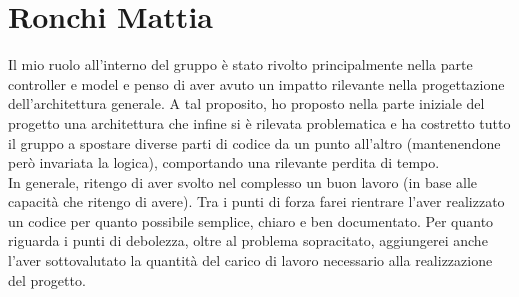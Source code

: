 \documentclass[a4paper,12pt]{report}
\begin{document}
\section{Ronchi Mattia}
Il mio ruolo all'interno del gruppo è stato rivolto principalmente nella parte controller e model e penso di aver avuto un impatto rilevante nella progettazione dell'architettura generale. A tal proposito, ho proposto nella parte iniziale del progetto una architettura che infine si è rilevata problematica e ha costretto tutto il gruppo a spostare diverse parti di codice da un punto all'altro (mantenendone però invariata la logica), comportando una rilevante perdita di tempo.\\
In generale, ritengo di aver svolto nel complesso un buon lavoro (in base alle capacità che ritengo di avere). Tra i punti di forza farei rientrare l'aver realizzato un codice per quanto possibile semplice, chiaro e ben documentato. Per quanto riguarda i punti di debolezza, oltre al problema sopracitato, aggiungerei anche l'aver sottovalutato la quantità del carico di lavoro necessario alla realizzazione del progetto.
\end{document}
